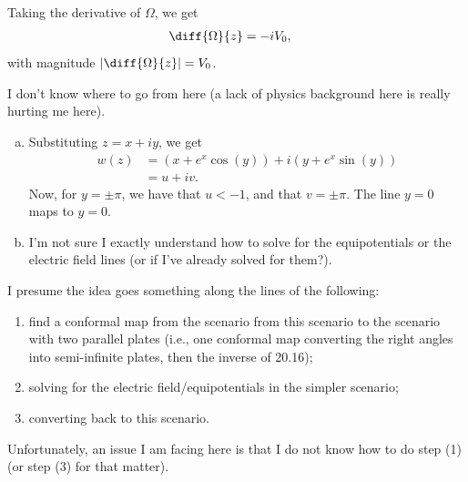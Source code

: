 \documentclass[10pt]{mypackage}
\begin{document}
\begin{solution}[20.15]
  Taking the derivative of $\Omega$, we get
  \begin{align*}
    \diff{\Omega}{z} &= -iV_0,
  \end{align*}
  with magnitude $\left\vert \diff{\Omega}{z} \right\vert = V_0$.\newline

  I don't know where to go from here (a lack of physics background here is really hurting me here).
\end{solution}
\begin{solution}[20.16]\hfill
  \begin{enumerate}[(a)]
    \item Substituting $z = x + iy$, we get
      \begin{align*}
        w(z) &= \left( x + e^{x}\cos(y) \right) + i \left( y + e^{x}\sin(y) \right)\\
             &= u + iv.
      \end{align*}
      Now, for $y = \pm \pi$, we have that $u < -1$, and that $v = \pm \pi$. The line $y = 0$ maps to $y = 0$.
    \item I'm not sure I exactly understand how to solve for the equipotentials or the electric field lines (or if I've already solved for them?).
  \end{enumerate}
\end{solution}
\begin{solution}[20.17]
  I presume the idea goes something along the lines of the following:
  \begin{enumerate}[(1)]
    \item find a conformal map from the scenario from this scenario to the scenario with two parallel plates (i.e., one conformal map converting the right angles into semi-infinite plates, then the inverse of 20.16);
    \item solving for the electric field/equipotentials in the simpler scenario;
    \item converting back to this scenario.
  \end{enumerate}
  Unfortunately, an issue I am facing here is that I do not know how to do step (1) (or step (3) for that matter).
\end{solution}
\end{document}
